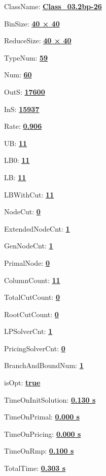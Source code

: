 \documentclass[11pt]{article}
\begin{document}
\pagestyle{empty}


ClassName: \underline{\textbf{Class_03.2bp-26}}
\par
BinSize: \underline{\textbf{40 × 40}}
\par
ReduceSize: \underline{\textbf{40 × 40}}
\par
TypeNum: \underline{\textbf{59}}
\par
Num: \underline{\textbf{60}}
\par
OutS: \underline{\textbf{17600}}
\par
InS: \underline{\textbf{15937}}
\par
Rate: \underline{\textbf{0.906}}
\par
UB: \underline{\textbf{11}}
\par
LB0: \underline{\textbf{11}}
\par
LB: \underline{\textbf{11}}
\par
LBWithCut: \underline{\textbf{11}}
\par
NodeCut: \underline{\textbf{0}}
\par
ExtendedNodeCnt: \underline{\textbf{1}}
\par
GenNodeCnt: \underline{\textbf{1}}
\par
PrimalNode: \underline{\textbf{0}}
\par
ColumnCount: \underline{\textbf{11}}
\par
TotalCutCount: \underline{\textbf{0}}
\par
RootCutCount: \underline{\textbf{0}}
\par
LPSolverCnt: \underline{\textbf{1}}
\par
PricingSolverCnt: \underline{\textbf{0}}
\par
BranchAndBoundNum: \underline{\textbf{1}}
\par
isOpt: \underline{\textbf{true}}
\par
TimeOnInitSolution: \underline{\textbf{0.130 s}}
\par
TimeOnPrimal: \underline{\textbf{0.000 s}}
\par
TimeOnPricing: \underline{\textbf{0.000 s}}
\par
TimeOnRmp: \underline{\textbf{0.100 s}}
\par
TotalTime: \underline{\textbf{0.303 s}}
\par
\newpage


\end{document}
